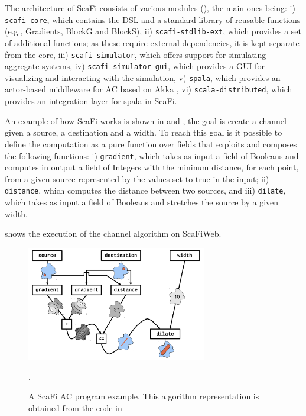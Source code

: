 \documentclass[12pt,a4paper,openright,twoside]{book}
\begin{document}
The architecture of ScaFi consists of various modules (), the main ones being:
    i) \texttt{scafi-core}, which contains the DSL and a standard library of reusable functions 
        (e.g., Gradients, BlockG and BlockS),
    ii) \texttt{scafi-stdlib-ext}, which provides a set of additional functions; as these require external dependencies, 
        it is kept separate from the core,
    iii) \texttt{scafi-simulator}, which offers support for simulating aggregate systems,
    iv) \texttt{scafi-simulator-gui}, which provides a GUI for visualizing and interacting with the simulation,
    v) \texttt{spala}, which provides an actor-based middleware for AC based on Akka \cite{hunt2014introduction},
    vi) \texttt{scala-distributed}, which provides an integration layer for spala in ScaFi.

An example of how ScaFi works is shown in  and , the goal is create a channel given 
    a source, a destination and a width. To reach this goal is it possible to define the computation as a pure function 
    over fields that exploits and composes the following functions:
    i) \texttt{gradient}, which takes as input a field of Booleans and computes in output a field of Integers with the 
        mininum distance, for each point, from a given source represented by the values set to true in the input;
    ii) \texttt{distance}, which computes the distance between two sources, and
    iii) \texttt{dilate}, which takes as input a field of Booleans and stretches the source by a given width.

 shows the execution of the channel algorithm on ScaFiWeb.

\begin{figure}[h!]
    \centering
    \includegraphics[width=0.7\textwidth]{figures/channel.png}
    \caption{A ScaFi AC program example. This algorithm representation is obtained from the code in }.
    \label{fig:channel}
\end{figure}
\end{document}
